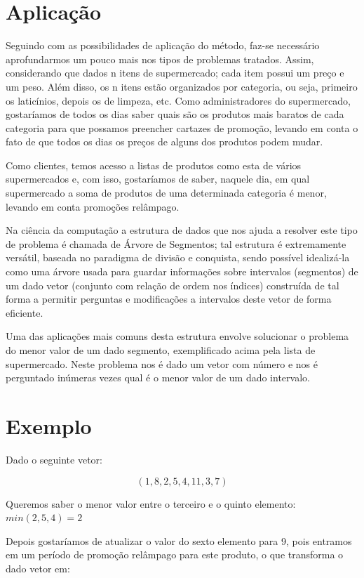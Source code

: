 \section{Aplicação}
Seguindo com as possibilidades de aplicação do método, faz-se necessário 
aprofundarmos um pouco mais nos tipos de problemas tratados. Assim, considerando 
que dados n itens de supermercado; cada item possui um preço e um peso. Além 
disso, os n itens estão organizados por categoria, ou seja, primeiro os laticínios, 
depois os de limpeza, etc. Como administradores do supermercado, gostaríamos de 
todos os dias saber quais são os produtos mais baratos de cada categoria para que 
possamos preencher cartazes de promoção, levando em conta o fato de que todos os 
dias os preços de alguns dos produtos podem mudar.

Como clientes, temos acesso a listas de produtos como esta de vários supermercados 
e, com isso, gostaríamos de saber, naquele dia, em qual supermercado a soma de 
produtos de uma determinada categoria é menor, levando em conta promoções 
relâmpago.

Na ciência da computação a estrutura de dados que nos ajuda a resolver este tipo 
de problema é chamada de Árvore de Segmentos; tal estrutura é extremamente versátil,
baseada no paradigma de divisão e conquista, sendo possível idealizá-la como uma 
árvore usada para guardar informações sobre intervalos (segmentos) de um dado 
vetor (conjunto com relação de ordem nos índices) construída de tal forma a 
permitir perguntas e modificações a intervalos deste vetor de forma eficiente.

Uma das aplicações mais comuns desta estrutura envolve solucionar o problema 
do menor valor de um dado segmento, exemplificado acima pela lista de supermercado. 
Neste problema nos é dado um vetor com número e nos é perguntado inúmeras vezes 
qual é o menor valor de um dado intervalo.

\section{Exemplo}
Dado o seguinte vetor:

$$(1, 8, 2, 5, 4, 11, 3, 7)$$

Queremos saber o menor valor entre o terceiro e o quinto elemento: 
$min (2, 5, 4) = 2$

Depois gostaríamos de atualizar o valor do sexto elemento para 9, pois entramos 
em um período de promoção relâmpago para este produto, o que transforma o dado 
vetor em: 

